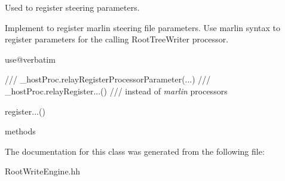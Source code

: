 Used to register steering parameters. 

\begin{DoxyVerb}Implement to register \a marlin steering file parameters. Use \a marlin syntax
to register parameters for the calling RootTreeWriter processor.

use@verbatim 
\end{DoxyVerb}
 /// \-\_\-host\-Proc.\-relay\-Register\-Processor\-Parameter(...) /// \-\_\-host\-Proc.\-relay\-Register...() ///  instead of {\itshape marlin} processors\begin{DoxyVerb}register...() \end{DoxyVerb}
 methods 

The documentation for this class was generated from the following file\-:\begin{DoxyCompactItemize}
\item 
Root\-Write\-Engine.\-hh\end{DoxyCompactItemize}
